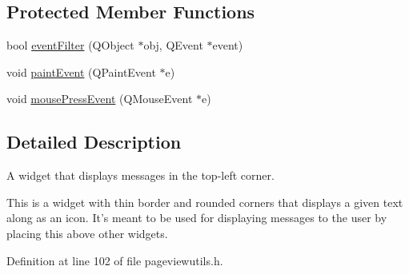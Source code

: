 \subsection*{Protected Member Functions}
\begin{DoxyCompactItemize}
\item 
bool \hyperlink{classPageViewMessage_ad1f5c357af9bdbcad72dd40702e63385}{event\+Filter} (Q\+Object $\ast$obj, Q\+Event $\ast$event)
\item 
void \hyperlink{classPageViewMessage_a9812285d6bc84d2e1eb20c1d76be18c3}{paint\+Event} (Q\+Paint\+Event $\ast$e)
\item 
void \hyperlink{classPageViewMessage_af14a282e4b5ce779de38e4a87afdf6ff}{mouse\+Press\+Event} (Q\+Mouse\+Event $\ast$e)
\end{DoxyCompactItemize}


\subsection{Detailed Description}
A widget that displays messages in the top-\/left corner. 

This is a widget with thin border and rounded corners that displays a given text along as an icon. It's meant to be used for displaying messages to the user by placing this above other widgets. 

Definition at line 102 of file pageviewutils.\+h.




